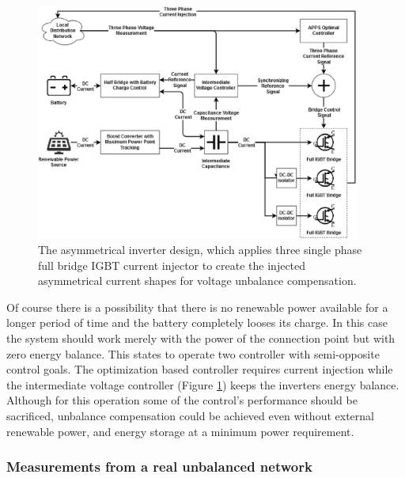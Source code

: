        \begin{figure}[ht]
        \centering
        \includegraphics[width=0.95\textwidth]{Unblance_EPS_Pics/inverter.eps}
        \caption{The asymmetrical inverter design, which applies three single phase full bridge IGBT current injector to create the injected asymmetrical current shapes for voltage unbalance compensation. }
        \label{fig:inv}
        \end{figure}


        Of course there is a possibility that there is no renewable power available for a longer period of time and the battery completely looses its charge. In this case the system should work merely with the power of the connection point but with zero energy balance. This states to operate two controller with semi-opposite control goals. The optimization based controller requires current injection while the intermediate voltage controller (Figure \ref{fig:inv}) keeps the inverters energy balance. Although for this operation some of the control's performance should be sacrificed, unbalance compensation could be achieved even without external renewable power, and energy storage at a minimum power requirement.

%

        \subsubsection{Measurements from a real unbalanced network}

